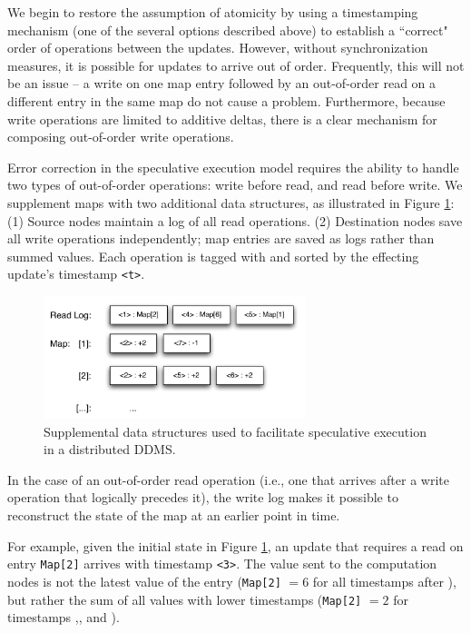 We begin to restore the assumption of atomicity by using a timestamping
mechanism (one of the several options described above) to establish a ``correct"
order of operations between the updates.  However, without synchronization
measures, it is possible for updates to arrive out of order.  Frequently, this
will not be an issue -- a write on one map entry followed by an out-of-order
read on a different entry in the same map do not cause a problem.  Furthermore,
because write operations are limited to additive deltas, there is a clear
mechanism for composing out-of-order write operations.

Error correction in the speculative execution model requires the ability to
handle two types of out-of-order operations: write before read, and read before
write.  We supplement maps with two additional data structures, as illustrated
in Figure \ref{fig:speculativeStorage}:  (1) Source nodes maintain a log of all
read operations.  (2) Destination nodes save all write operations independently;
map entries are saved as logs rather than summed values.  Each operation is
tagged with and sorted by the effecting update's timestamp \texttt{<t>}.

\begin{figure}
\begin{center}
\includegraphics[width=3.0in]{graphics/speculative_storage}
\end{center}
\caption{Supplemental data structures used to facilitate speculative execution in a distributed DDMS.}
\label{fig:speculativeStorage}
\end{figure}

In the case of an out-of-order read operation (i.e., one that arrives after a
write operation that logically precedes it), the write log makes it possible to
reconstruct the state of the map at an earlier point in time.

For example, given the initial state in Figure \ref{fig:speculativeStorage}, an
update that requires a read on entry \texttt{Map[2]} arrives with timestamp
\texttt{<3>}.  The value sent to the computation nodes is not the latest value
of the entry ({\tt Map[2]} $ = 6$ for all timestamps after {\tt <6>}), but
rather the sum of all values with lower timestamps ({\tt Map[2]} $ = 2$ for
timestamps {\tt <3>},{\tt <4>}, and {\tt <5>}).

